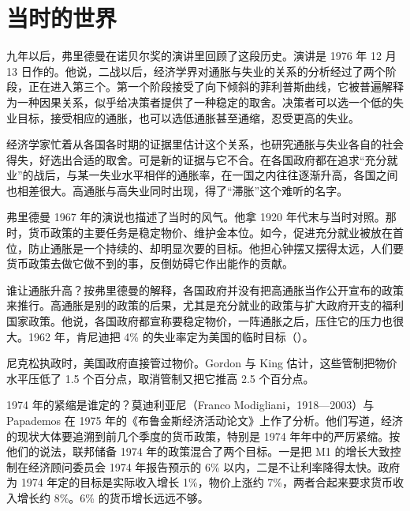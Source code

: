 \section{当时的世界}\label{sec:naturalrate-world}

九年以后，弗里德曼在诺贝尔奖的演讲里回顾了这段历史。演讲是 1976 年 12 月 13 日作的\cite{friedman1976}。他说，二战以后，经济学界对通胀与失业的关系的分析经过了两个阶段，正在进入第三个\cite{friedman1976}。第一个阶段接受了向下倾斜的菲利普斯曲线，它被普遍解释为一种因果关系，似乎给决策者提供了一种稳定的取舍\cite{friedman1976}。决策者可以选一个低的失业目标，接受相应的通胀，也可以选低通胀甚至通缩，忍受更高的失业\cite{friedman1976}。

经济学家忙着从各国各时期的证据里估计这个关系，也研究通胀与失业各自的社会得失，好选出合适的取舍\cite{friedman1976}。可是新的证据与它不合\cite{friedman1976}。在各国政府都在追求“充分就业”的战后，与某一失业水平相伴的通胀率，在一国之内往往逐渐升高，各国之间也相差很大\cite{friedman1976}。高通胀与高失业同时出现，得了“滞胀”这个难听的名字\cite{friedman1976}。

弗里德曼 1967 年的演说也描述了当时的风气。他拿 1920 年代末与当时对照\cite{friedman1968}。那时，货币政策的主要任务是稳定物价、维护金本位\cite{friedman1968}。如今，促进充分就业被放在首位，防止通胀是一个持续的、却明显次要的目标\cite{friedman1968}。他担心钟摆又摆得太远，人们要货币政策去做它做不到的事，反倒妨碍它作出能作的贡献\cite{friedman1968}。

谁让通胀升高？按弗里德曼的解释，各国政府并没有把高通胀当作公开宣布的政策来推行\cite{friedman1976}。高通胀是别的政策的后果，尤其是充分就业的政策与扩大政府开支的福利国家政策\cite{friedman1976}。他说，各国政府都宣称要稳定物价，一阵通胀之后，压住它的压力也很大\cite{friedman1976}。1962 年，肯尼迪把 4\% 的失业率定为美国的临时目标（）。

尼克松执政时，美国政府直接管过物价。Gordon 与 King 估计，这些管制把物价水平压低了 1.5 个百分点，取消管制又把它推高 2.5 个百分点\cite{gordon1982}。

1974 年的紧缩是谁定的？莫迪利亚尼（Franco Modigliani，1918—2003）与 Papademos 在 1975 年的《布鲁金斯经济活动论文》上作了分析\cite{modigliani1975,loc44,gnd44}。他们写道，经济的现状大体要追溯到前几个季度的货币政策，特别是 1974 年年中的严厉紧缩\cite{modigliani1975}。按他们的说法，联邦储备 1974 年的政策混合了两个目标\cite{modigliani1975}。一是把 M1 的增长大致控制在经济顾问委员会 1974 年报告预示的 6\% 以内，二是不让利率降得太快\cite{modigliani1975}。政府为 1974 年定的目标是实际收入增长 1\%，物价上涨约 7\%，两者合起来要求货币收入增长约 8\%\cite{modigliani1975}。6\% 的货币增长远远不够\cite{modigliani1975}。

